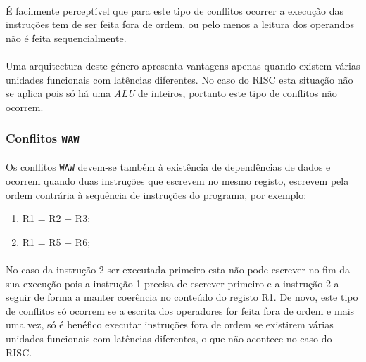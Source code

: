 \paragraph{} É facilmente perceptível que para este tipo de conflitos ocorrer a execução das instruções tem de ser feita fora de ordem, ou pelo menos a leitura dos operandos não é feita sequencialmente. 

\paragraph{} Uma arquitectura deste género apresenta vantagens apenas quando existem várias unidades funcionais com latências diferentes. No caso do \textmu RISC esta situação não se aplica pois só há uma \textit{ALU} de inteiros, portanto este tipo de conflitos não ocorrem.

\subsubsection{Conflitos \texttt{WAW} }

\paragraph{} Os conflitos \texttt{WAW} devem-se também à existência de dependências de dados e ocorrem quando duas instruções que escrevem no mesmo registo, escrevem pela ordem contrária à sequência de instruções do programa, por exemplo:

\begin{enumerate}
	\item R1 = R2 + R3;
	\item R1 = R5 + R6;
\end{enumerate}

\paragraph{}No caso da instrução 2 ser executada primeiro esta não pode escrever no fim da sua execução pois a instrução 1 precisa de escrever primeiro e a instrução 2 a seguir de forma a manter coerência no conteúdo do registo R1. De novo, este tipo de conflitos só ocorrem se a escrita dos operadores for feita fora de ordem e mais uma vez, só é benéfico executar instruções fora de ordem se existirem várias unidades funcionais com latências diferentes, o que não acontece no caso do \textmu RISC.


